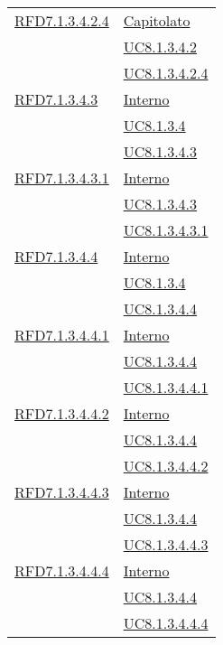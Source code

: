 \begin{longtable}{|>{\centering}m{5cm}|m{5cm}<{\centering}|}
\hyperlink{RFD7.1.3.4.2.4}{RFD7.1.3.4.2.4} & \hyperlink{Capitolato}{Capitolato}\\
& \hyperref[UC8.1.3.4.2]{UC8.1.3.4.2}\\
& \hyperref[UC8.1.3.4.2.4]{UC8.1.3.4.2.4}\\ \hline

\hyperlink{RFD7.1.3.4.3}{RFD7.1.3.4.3} & \hyperlink{Interno}{Interno}\\
& \hyperref[UC8.1.3.4]{UC8.1.3.4}\\
& \hyperref[UC8.1.3.4.3]{UC8.1.3.4.3}\\ \hline

\hyperlink{RFD7.1.3.4.3.1}{RFD7.1.3.4.3.1} & \hyperlink{Interno}{Interno}\\
& \hyperref[UC8.1.3.4.3]{UC8.1.3.4.3}\\
& \hyperref[UC8.1.3.4.3.1]{UC8.1.3.4.3.1}\\ \hline

\hyperlink{RFD7.1.3.4.4}{RFD7.1.3.4.4} & \hyperlink{Interno}{Interno}\\
& \hyperref[UC8.1.3.4]{UC8.1.3.4}\\
& \hyperref[UC8.1.3.4.4]{UC8.1.3.4.4}\\ \hline

\hyperlink{RFD7.1.3.4.4.1}{RFD7.1.3.4.4.1} & \hyperlink{Interno}{Interno}\\
& \hyperref[UC8.1.3.4.4]{UC8.1.3.4.4}\\
& \hyperref[UC8.1.3.4.4.1]{UC8.1.3.4.4.1}\\ \hline

\hyperlink{RFD7.1.3.4.4.2}{RFD7.1.3.4.4.2} & \hyperlink{Interno}{Interno}\\
& \hyperref[UC8.1.3.4.4]{UC8.1.3.4.4}\\
& \hyperref[UC8.1.3.4.4.2]{UC8.1.3.4.4.2}\\ \hline

\hyperlink{RFD7.1.3.4.4.3}{RFD7.1.3.4.4.3} & \hyperlink{Interno}{Interno}\\
& \hyperref[UC8.1.3.4.4]{UC8.1.3.4.4}\\
& \hyperref[UC8.1.3.4.4.3]{UC8.1.3.4.4.3}\\ \hline

\hyperlink{RFD7.1.3.4.4.4}{RFD7.1.3.4.4.4} & \hyperlink{Interno}{Interno}\\
& \hyperref[UC8.1.3.4.4]{UC8.1.3.4.4}\\
& \hyperref[UC8.1.3.4.4.4]{UC8.1.3.4.4.4}\\ \hline


\end{longtable}
